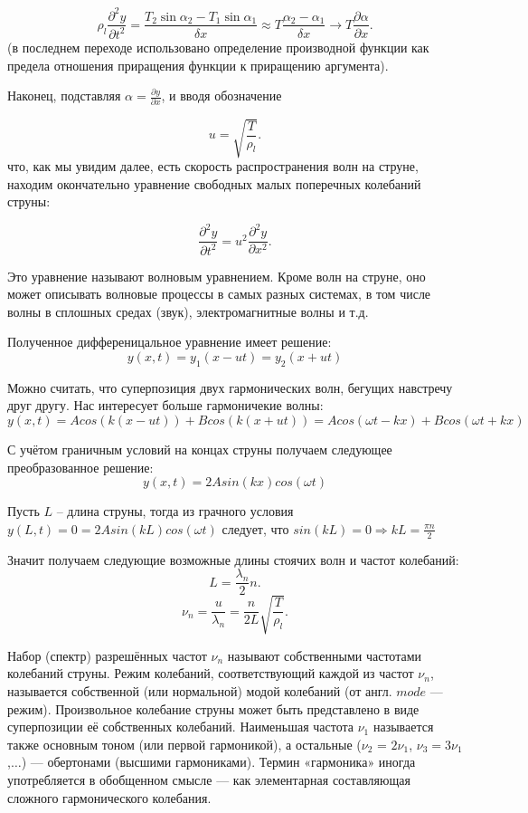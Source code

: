 \documentclass[a4paper, 12pt]{article} %
\begin{document}
\[ \rho_l \frac{\partial^2{y}}{\partial{t^2}} = \frac{T_2 \sin{\alpha_2} - T_1 \sin{\alpha_1}}{\delta x} \approx T \frac{\alpha_2 - \alpha_1}{\delta x} \rightarrow T\frac{\partial{\alpha}}{\partial{x}}. \]
(в последнем переходе использовано определение производной функции как
предела отношения приращения функции к приращению аргумента).

Наконец, подставляя $\alpha = \frac{\partial y}{\partial x}$, и вводя обозначение

\[ u = \sqrt{\frac{T}{\rho_l}} .\]
что, как мы увидим далее, есть скорость распространения волн на струне, находим окончательно уравнение свободных малых поперечных колебаний струны:

\[  \frac{\partial^2 y}{\partial t^2} = u^2\frac{\partial^2 y}{\partial x^2} .\]

Это уравнение называют волновым уравнением. Кроме волн на струне, оно
может описывать волновые процессы в самых разных системах, в том числе
волны в сплошных средах (звук), электромагнитные волны и т.д.

Полученное дифференицальное уравнение имеет решение:
\[y(x,t) = y_1(x-ut) = y_2(x+ut)\]

Можно считать, что суперпозиция двух гармонических волн,
бегущих навстречу друг другу. Нас интересует больше гармоничекие волны: 
\[y(x,t) = Acos(k(x-ut)) + Bcos(k(x+ut)) = Acos(\omega t -kx) + Bcos(\omega t +kx)\]

С учётом граничным условий на концах струны получаем следующее преобразованное решение:
\[y(x,t) = 2Asin(kx)cos(\omega t)\]

 Пусть $L$ -- длина струны, тогда из грачного условия $y(L,t) = 0 = 2Asin(kL)cos(\omega t)$ следует, что $sin(kL) = 0 \Rightarrow kL = \frac{\pi n}{2}$

Значит получаем следующие возможные длины стоячих волн и частот колебаний:
\[ L = \frac{\lambda_n}{2}n .\]
\[ \nu_n = \frac{u}{\lambda_n} = \frac{n}{2L} \sqrt{\frac{T}{\rho_l}} .\]

Набор (спектр) разрешённых частот $\nu_n$ называют собственными частотами
колебаний струны. Режим колебаний, соответствующий каждой из частот $\nu_n$,
называется собственной (или нормальной) модой колебаний (от англ. $mode$ —
режим). Произвольное колебание струны может быть представлено в виде суперпозиции её собственных колебаний. Наименьшая частота $\nu_1$ называется
также основным тоном (или первой гармоникой), а остальные ($\nu_2$ = $2 \nu_1$, $\nu_3 = 3\nu_1$,$\dots$) — обертонами (высшими гармониками). Термин «гармоника» иногда
употребляется в обобщенном смысле — как элементарная составляющая
сложного гармонического колебания.
\end{document}
